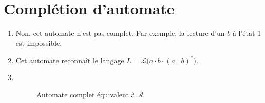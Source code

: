 \section{Complétion d'automate}

\begin{enumerate}
	\item Non, cet automate n'est pas complet. Par exemple, la lecture d'un $b$\/ à l'état 1 est impossible.
	\item Cet automate reconnaît le langage $L = \mathcal{L}\big(a \cdot b\cdot (a \mid b)^*\big)$.
	\item~

		\begin{figure}[H]
			\centering
			\caption{Automate complet équivalent à $\mathcal{A}$}
		\end{figure}
\end{enumerate}



